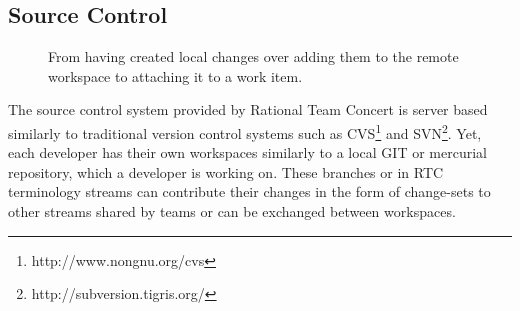 \subsection{Source Control}
\begin{figure}
\centering
{}


\caption{From having created local changes over adding them to the remote workspace to attaching it to a work item.}
\label{fig:changeset}
\end{figure}

The source control system provided by Rational Team Concert is server based similarly to traditional version control systems such as CVS\footnote{http://www.nongnu.org/cvs} and SVN\footnote{http://subversion.tigris.org/}.
Yet, each developer has their own workspaces similarly to a local GIT or mercurial repository, which a developer is working on.
These branches or in RTC terminology streams can contribute their changes in the form of change-sets to other streams shared by teams or can be exchanged between workspaces.

